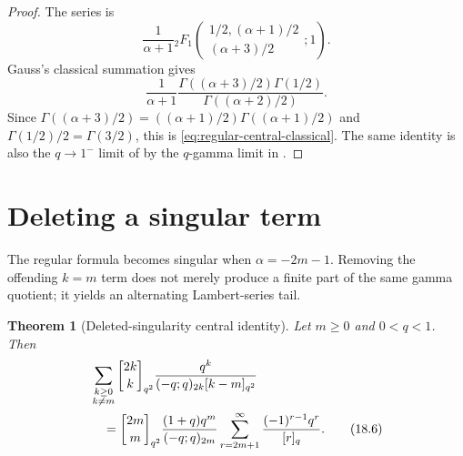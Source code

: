 \documentclass[11pt,oneside,openany]{book}
\newtheorem{theorem}{Theorem}[chapter]
\theoremstyle{definition}
\theoremstyle{remark}
\newcommand{\Qbinom}[3]{\genfrac{[}{]}{0pt}{}{#1}{#2}_{#3}}
\begin{document}
\begin{proof}
The series is
\[
 \frac1{\alpha+1}
 {}_2F_1\!\left(
 \begin{matrix}1/2,(\alpha+1)/2\\(\alpha+3)/2\end{matrix};1\right).
\]
Gauss's classical summation gives
\[
 \frac1{\alpha+1}
 \frac{\Gamma((\alpha+3)/2)\Gamma(1/2)}
      {\Gamma((\alpha+2)/2)}.
\]
Since $\Gamma((\alpha+3)/2)=((\alpha+1)/2)\Gamma((\alpha+1)/2)$ and $\Gamma(1/2)/2=\Gamma(3/2)$, this is \eqref{eq:regular-central-classical}.  The same identity is also the $q\to1^-$ limit of  by the $q$-gamma limit in .
\end{proof}

\section{Deleting a singular term}

The regular formula becomes singular when $\alpha=-2m-1$.  Removing the offending $k=m$ term does not merely produce a finite part of the same gamma quotient; it yields an alternating Lambert-series tail.

\begin{theorem}[Deleted-singularity central identity]\label{thm:singular-central}
Let $m\ge0$ and $0<q<1$.  Then
\begin{align}
 &\sum_{\substack{k\ge0\\k\ne m}}
 \Qbinom{2k}{k}{q^2}
 \frac{q^k}{(-q;q)_{2k}[k-m]_{q^2}}
 \notag\\
 &\quad=
 \Qbinom{2m}{m}{q^2}
 \frac{(1+q)q^m}{(-q;q)_{2m}}
 \sum_{r=2m+1}^{\infty}
 \frac{(-1)^{r-1}q^r}{[r]_q}.
 \tag{18.6}\label{eq:singular-central}
\end{align}
\end{theorem}
\end{document}
